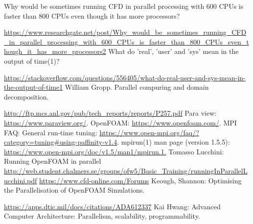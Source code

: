 \documentclass{article}
\begin{document}
\newpage
{}
\begin{thebibliography}{9} 
    \bibitem{} 
        Why would be sometimes running CFD in parallel processing with 600 CPUs is faster than 800 CPUs even though it has more processors?  

        \url{https://www.researchgate.net/post/Why_would_be_sometimes_running_CFD_in_parallel_processing_with_600_CPUs_is_faster_than_800_CPUs_even_though_it_has_more_processors2} 
        What do 'real', 'user' and 'sys' mean in the output of time(1)?

        \url{https://stackoverflow.com/questions/556405/what-do-real-user-and-sys-mean-in-the-output-of-time1}
    \bibitem{} 
        William Gropp.
        Parallel compuring and domain decomposition.

        \url{http://ftp.mcs.anl.gov/pub/tech_reports/reports/P257.pdf}
        Para view: \url{https://www.paraview.org/}.
    \bibitem{}
        OpenFOAM: \url{https://www.openfoam.com/}.
    \bibitem{}
        MPI FAQ: General run-time tuning: \url{https://www.open-mpi.org/faq/?category=tuning#using-paffinity-v1.4}.
    \bibitem{}
        mpirun(1) man page (version 1.5.5): \url{https://www.open-mpi.org/doc/v1.5/man1/mpirun.1.}
    \bibitem{}
        Tomasso Lucchini: Running OpenFOAM in parallel \url{http://web.student.chalmers.se/groups/ofw5/Basic_Training/runningInParallelLucchini.pdf}
    \bibitem{}
        \url{https://www.cfd-online.com/Forums}
    \bibitem{}
        Keough, Shannon: Optimising the Parallelisation of OpenFOAM Simulations. 

        \url{https://apps.dtic.mil/docs/citations/ADA612337}
    \bibitem{}
        Kai Hwang: Advanced Computer Architecture: Parallelism, scalability, programmability.
\end{thebibliography}
\end{document}
